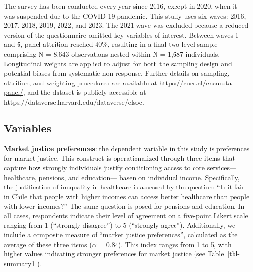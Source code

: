 \documentclass[
  12pt,
]{article}
\begin{document}
The survey has been conducted every year since 2016, except in 2020,
when it was suspended due to the COVID-19 pandemic. This study uses six
waves: 2016, 2017, 2018, 2019, 2022, and 2023. The 2021 wave was
excluded because a reduced version of the questionnaire omitted key
variables of interest. Between waves 1 and 6, panel attrition reached
40\%, resulting in a final two-level sample comprising N = 8,643
observations nested within N = 1,687 individuals. Longitudinal weights
are applied to adjust for both the sampling design and potential biases
from systematic non-response. Further details on sampling, attrition,
and weighting procedures are available at
\url{https://coes.cl/encuesta-panel/}, and the dataset is publicly
accessible at \url{https://dataverse.harvard.edu/dataverse/elsoc}.

\subsection{Variables}\label{variables}

\textbf{Market justice preferences}: the dependent variable in this
study is preferences for market justice. This construct is
operationalized through three items that capture how strongly
individuals justify conditioning access to core services---healthcare,
pensions, and education--- basen on individual income. Specifically, the
justification of inequality in healthcare is assessed by the question:
``Is it fair in Chile that people with higher incomes can access better
healthcare than people with lower incomes?'' The same question is posed
for pensions and education. In all cases, respondents indicate their
level of agreement on a five-point Likert scale ranging from 1
(``strongly disagree'') to 5 (``strongly agree''). Additionally, we
include a composite measure of ``market justice preferences'',
calculated as the average of these three items (\(\alpha\) = 0.84). This
index ranges from 1 to 5, with higher values indicating stronger
preferences for market justice (see Table~\ref{tbl-summary1}).
\end{document}
